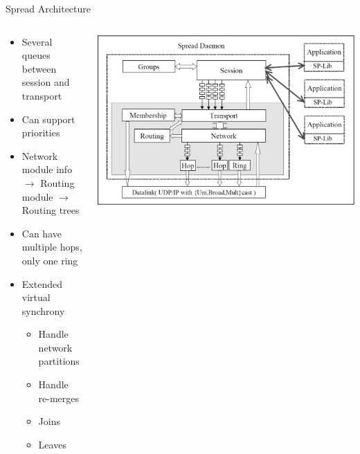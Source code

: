 \documentclass[pdftex]{beamer}
\begin{document}
\begin{frame}{Spread Architecture}
\begin{columns}
\begin{column}{.5\textwidth}

\begin{itemize}
\item Several queues between session and transport
\item Can support priorities
\item Network module info $\rightarrow$ Routing module $\rightarrow$ \\ Routing trees
\item Can have multiple hops, only one ring
\item Extended virtual synchrony
	\begin{itemize}
		\item Handle network partitions
		\item Handle re-merges
		\item Joins
		\item Leaves
	\end{itemize}

\end{itemize}
\end{column}
	
\begin{column}{.5\textwidth}
\includegraphics[width=\textwidth]{spread_architecture}
\end{column}

\end{columns}
\end{frame}

\end{document}
